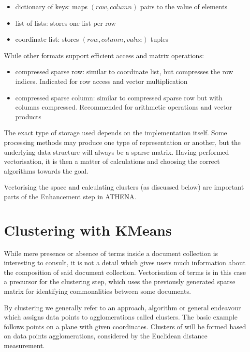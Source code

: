 \documentclass[12pt,a4paper,twoside]{report}
\begin{document}
\begin{itemize}
\item dictionary of keys: maps $(row, column)$ pairs to the value of elements
\item list of lists: stores one list per row
\item coordinate list: stores $(row, column, value)$ tuples
\end{itemize}

While other formats support efficient access and matrix operations:

\begin{itemize}
\item compressed sparse row: similar to coordinate list, but compresses the row indices. Indicated for row access and vector multiplication
\item compressed sparse column: similar to compressed sparse row but with columns compressed. Recommended for arithmetic operations and vector products
\end{itemize}

The exact type of storage used depends on the implementation itself. Some processing methods may produce one type of representation or another, but the underlying data structure will always be a sparse matrix. Having performed vectorisation, it is then a matter of calculations and choosing the correct algorithms towards the goal.

Vectorising the space and calculating clusters (as discussed below) are important parts of the Enhancement step in ATHENA.

\section{Clustering with KMeans}
While mere presence or absence of terms inside a document collection is interesting to consult, it is not a detail which gives users much information about the composition of said document collection. Vectorisation of terms is in this case a precursor for the clustering step, which uses the previously generated sparse matrix for identifying commonalities between some documents.

By clustering we generally refer to an approach, algorithm or general endeavour which assigns data points to agglomerations called clusters. The basic example follows points on a plane with given coordinates. Clusters of will be formed based on data points agglomerations, considered by the Euclidean distance measurement.
\end{document}
